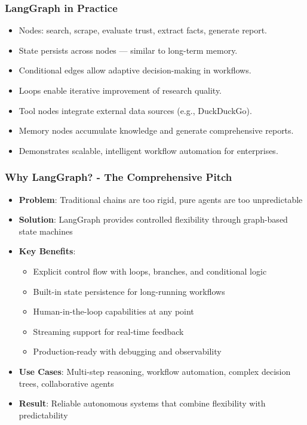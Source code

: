 \begin{frame}[fragile]\frametitle{LangGraph in Practice}
    \begin{itemize}
        \item Nodes: search, scrape, evaluate trust, extract facts, generate report.
        \item State persists across nodes — similar to long-term memory.
        \item Conditional edges allow adaptive decision-making in workflows.
        \item Loops enable iterative improvement of research quality.
        \item Tool nodes integrate external data sources (e.g., DuckDuckGo).
        \item Memory nodes accumulate knowledge and generate comprehensive reports.
        \item Demonstrates scalable, intelligent workflow automation for enterprises.
    \end{itemize}
\end{frame}


\begin{frame}[fragile]\frametitle{Why LangGraph? - The Comprehensive Pitch}
      \begin{itemize}
        \item \textbf{Problem}: Traditional chains are too rigid, pure agents are too unpredictable
        \item \textbf{Solution}: LangGraph provides controlled flexibility through graph-based state machines
        \item \textbf{Key Benefits}:
        \begin{itemize}
            \item Explicit control flow with loops, branches, and conditional logic
            \item Built-in state persistence for long-running workflows
            \item Human-in-the-loop capabilities at any point
            \item Streaming support for real-time feedback
            \item Production-ready with debugging and observability
        \end{itemize}
        \item \textbf{Use Cases}: Multi-step reasoning, workflow automation, complex decision trees, collaborative agents
        \item \textbf{Result}: Reliable autonomous systems that combine flexibility with predictability
      \end{itemize}
\end{frame}

